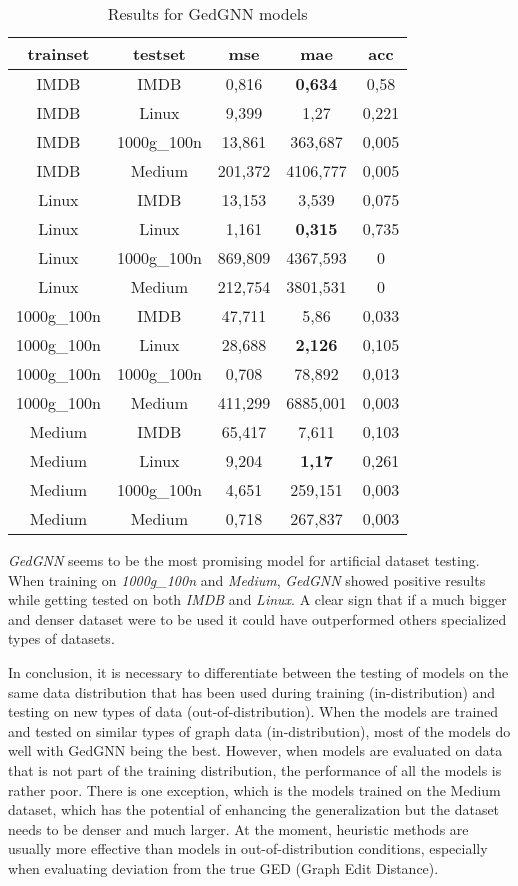 \documentclass[../Thesis.tex]{subfiles}
\begin{document}
	\begin{table}[H]
		\centering
		\setlength\tabcolsep{4pt}
		\renewcommand{\arraystretch}{1.2}
		\begin{tabular}{c|c|c|c|c}
			\toprule
			\textbf{trainset} & \textbf{testset} & \textbf{mse} & \textbf{mae} & \textbf{acc} \\
			\midrule
IMDB & IMDB & 0,816 & \textbf{0,634} & 0,58 \\
IMDB & Linux & 9,399 & 1,27 & 0,221 \\
IMDB & 1000g\_100n & 13,861 & 363,687 & 0,005 \\
IMDB & Medium & 201,372 & 4106,777 & 0,005 \\ \midrule
Linux & IMDB & 13,153 & 3,539 & 0,075 \\
Linux & Linux & 1,161 & \textbf{0,315} & 0,735 \\
Linux & 1000g\_100n & 869,809 & 4367,593 & 0 \\
Linux & Medium & 212,754 & 3801,531 & 0 \\ \midrule
1000g\_100n & IMDB & 47,711 & 5,86 & 0,033 \\
1000g\_100n & Linux & 28,688 & \textbf{2,126} & 0,105 \\
1000g\_100n & 1000g\_100n & 0,708 & 78,892 & 0,013 \\
1000g\_100n & Medium & 411,299 & 6885,001 & 0,003 \\ \midrule
Medium & IMDB & 65,417 & 7,611 & 0,103 \\
Medium & Linux & 9,204 & \textbf{1,17} & 0,261 \\
Medium & 1000g\_100n & 4,651 & 259,151 & 0,003 \\
Medium & Medium & 0,718 & 267,837 & 0,003 \\
			\bottomrule
		\end{tabular}
		\caption{Results for GedGNN models}
		\label{table:gedgnn}
	\end{table}	
	
	\emph{GedGNN} seems to be the most promising model for artificial dataset testing. When training on \emph{1000g\_100n} and \emph{Medium}, \emph{GedGNN} showed positive results while getting tested on both \emph{IMDB} and \emph{Linux}. A clear sign that if a much bigger and denser dataset were to be used it could have outperformed others specialized types of datasets.
	
	In conclusion, it is necessary to differentiate between the testing of models on the same data distribution that has been used during training (in-distribution) and testing on new types of data (out-of-distribution). When the models are trained and tested on similar types of graph data (in-distribution), most of the models do well with GedGNN being the best. However, when models are evaluated on data that is not part of the training distribution, the performance of all the models is rather poor. There is one exception, which is the models trained on the Medium dataset, which has the potential of enhancing the generalization but the dataset needs to be denser and much larger. At the moment, heuristic methods are usually more effective than models in out-of-distribution conditions, especially when evaluating deviation from the true GED (Graph Edit Distance).
	
\end{document}

